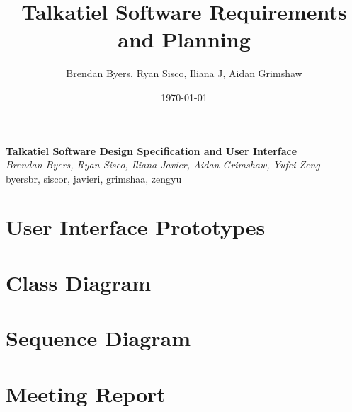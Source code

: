 \documentclass[12pt]{article}
\title{Talkatiel Software Requirements and Planning}
\author{Brendan Byers, Ryan Sisco, Iliana J, Aidan Grimshaw}
\date{\today}
\begin{document}
\begin{center}
      \Large\textbf{Talkatiel Software Design Specification and User Interface}\\
      \large\textit{Brendan Byers, Ryan Sisco, Iliana Javier, Aidan Grimshaw, Yufei Zeng}\\
      \large{byersbr, siscor, javieri, grimshaa, zengyu}\\
   \end{center}

\section{User Interface Prototypes}
\section{Class Diagram}
\section{Sequence Diagram}
\section{Meeting Report}
 
\end{document}
